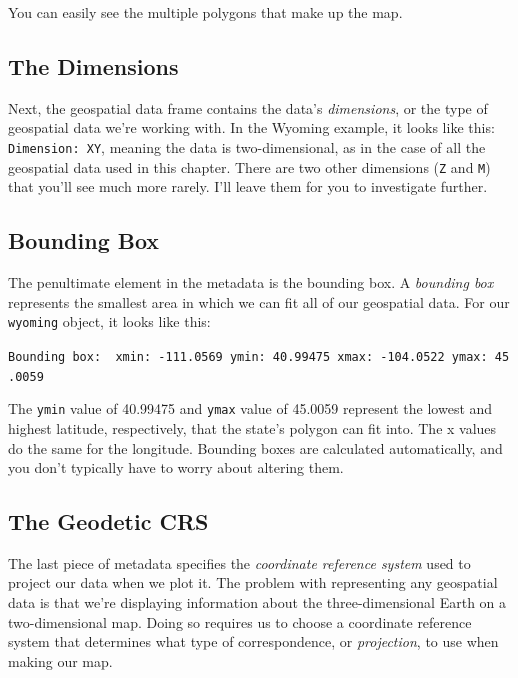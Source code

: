 \documentclass[
]{book}
\begin{document}
You can easily see the multiple polygons that make up the map.

\hypertarget{the-dimensions}{%
\subsection*{The Dimensions}\label{the-dimensions}}

Next, the geospatial data frame contains the data's \emph{dimensions}, or the type of geospatial data we're working with. In the Wyoming example, it looks like this: \texttt{Dimension:\ XY}, meaning the data is two-dimensional, as in the case of all the geospatial data used in this chapter. There are two other dimensions (\texttt{Z} and \texttt{M}) that you'll see much more rarely. I'll leave them for you to investigate further.

\hypertarget{bounding-box}{%
\subsection*{Bounding Box}\label{bounding-box}}

The penultimate element in the metadata is the bounding box. A \emph{bounding box} represents the smallest area in which we can fit all of our geospatial data. For our \texttt{wyoming} object, it looks like this:

\texttt{Bounding\ box:\ \ xmin:\ -111.0569\ ymin:\ 40.99475\ xmax:\ -104.0522\ ymax:\ 45.0059}

The \texttt{ymin} value of 40.99475 and \texttt{ymax} value of 45.0059 represent the lowest and highest latitude, respectively, that the state's polygon can fit into. The x values do the same for the longitude. Bounding boxes are calculated automatically, and you don't typically have to worry about altering them.

\hypertarget{the-geodetic-crs}{%
\subsection*{The Geodetic CRS}\label{the-geodetic-crs}}

The last piece of metadata specifies the \emph{coordinate reference system} used to project our data when we plot it. The problem with representing any geospatial data is that we're displaying information about the three-dimensional Earth on a two-dimensional map. Doing so requires us to choose a coordinate reference system that determines what type of correspondence, or \emph{projection}, to use when making our map.
\end{document}
